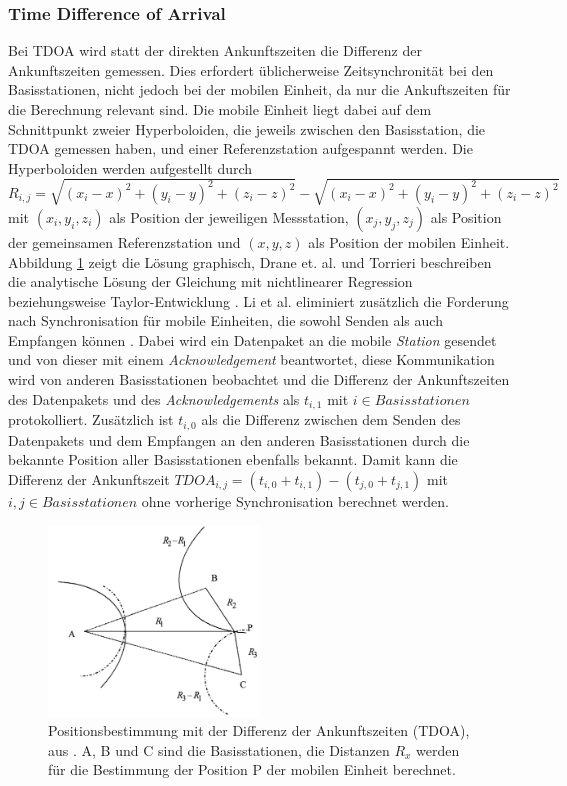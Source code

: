 \subsubsection{Time Difference of Arrival}
Bei TDOA wird statt der direkten Ankunftszeiten die Differenz der Ankunftszeiten gemessen. 
Dies erfordert üblicherweise Zeitsynchronität bei den Basisstationen, nicht jedoch bei der mobilen Einheit, da nur die Ankuftszeiten für die Berechnung relevant sind. 
Die mobile Einheit liegt dabei auf dem Schnittpunkt zweier Hyperboloiden, die jeweils zwischen den Basisstation, die TDOA gemessen haben, und einer Referenzstation aufgespannt werden. 
Die Hyperboloiden werden aufgestellt durch 
$R_{i,j} = \sqrt{(x_i - x)^2 + (y_i - y)^2 + (z_i - z)^2} - \sqrt{(x_i - x)^2 + (y_i - y)^2 + (z_i - z)^2}$ mit $(x_i,y_i,z_i)$ als Position der jeweiligen Messstation, $(x_j,y_j,z_j)$ als Position der gemeinsamen Referenzstation und $(x,y,z)$ als Position der mobilen Einheit. 
Abbildung \ref{fig:tdoa} zeigt die Lösung graphisch, Drane et. al. und Torrieri beschreiben die analytische Lösung der Gleichung mit nichtlinearer Regression \cite{drane1998positioning} beziehungsweise Taylor-Entwicklung \cite{torrieri1984statistical}. 
Li et al. eliminiert zusätzlich die Forderung nach Synchronisation für mobile Einheiten, die sowohl Senden als auch Empfangen können \cite{li2000comparison}. 
Dabei wird ein Datenpaket an die mobile \emph{Station} gesendet und von dieser mit einem \emph{Acknowledgement} beantwortet, diese Kommunikation wird von anderen Basisstationen beobachtet und die Differenz der Ankunftszeiten des Datenpakets und des \emph{Acknowledgements} als $t_{i,1}$ mit $i \in Basisstationen$ protokolliert. 
Zusätzlich ist $t_{i,0}$ als die Differenz zwischen dem Senden des Datenpakets und dem Empfangen an den anderen Basisstationen durch die bekannte Position aller Basisstationen ebenfalls bekannt. 
Damit kann die Differenz der Ankunftszeit $TDOA_{i,j} = (t_{i,0} + t_{i,1}) - (t_{j,0} + t_{j,1})$ mit $i,j \in Basisstationen$ ohne vorherige Synchronisation berechnet werden. 

\begin{figure}[h]
  \centering
	\includegraphics[width=0.5\textwidth]{images/tdoa.png}
  \caption{Positionsbestimmung mit der Differenz der Ankunftszeiten (TDOA), aus \cite{liu2007survey}. A, B und C sind die Basisstationen, die Distanzen $R_x$ werden für die Bestimmung der Position P der mobilen Einheit berechnet.}
  \label{fig:tdoa}
\end{figure}

